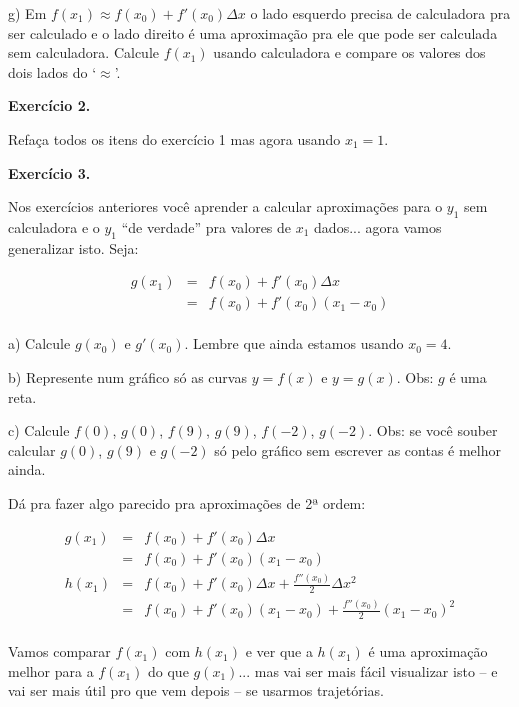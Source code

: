 \documentclass[oneside,12pt]{article}
\begin{document}
g) Em $f(x_1) ≈ f(x_0) + f'(x_0)Δx$ o lado esquerdo precisa de
calculadora pra ser calculado e o lado direito é uma aproximação pra
ele que pode ser calculada sem calculadora. Calcule $f(x_1)$ usando
calculadora e compare os valores dos dois lados do `$≈$'.

\bsk

{\bf Exercício 2.}

Refaça todos os itens do exercício 1 mas agora usando $x_1=1$.



\newpage


{\bf Exercício 3.}

Nos exercícios anteriores você aprender a calcular aproximações para o
$y_1$ sem calculadora e o $y_1$ ``de verdade'' pra valores de $x_1$
dados... agora vamos generalizar isto. Seja:

$$\begin{array}{rcl}
  g(x_1) &=& f(x_0) + f'(x_0)Δx \\
         &=& f(x_0) + f'(x_0)(x_1-x_0) \\
  \end{array}
$$

a) Calcule $g(x_0)$ e $g'(x_0)$. Lembre que ainda estamos usando
$x_0=4$.

b) Represente num gráfico só as curvas $y=f(x)$ e $y=g(x)$. Obs: $g$ é
uma reta.

c) Calcule $f(0)$, $g(0)$, $f(9)$, $g(9)$, $f(-2)$, $g(-2)$. Obs: se
você souber calcular $g(0)$, $g(9)$ e $g(-2)$ só pelo gráfico sem
escrever as contas é melhor ainda.

\newpage

Dá pra fazer algo parecido pra aproximações de 2ª ordem:

$$\begin{array}{rcl}
  g(x_1) &=& f(x_0) + f'(x_0)Δx \\
         &=& f(x_0) + f'(x_0)(x_1-x_0) \\
  h(x_1) &=& f(x_0) + f'(x_0)Δx        + \frac{f''(x_0)}{2}Δx^2 \\
         &=& f(x_0) + f'(x_0)(x_1-x_0) + \frac{f''(x_0)}{2}(x_1-x_0)^2 \\
  \end{array}
$$

Vamos comparar $f(x_1)$ com $h(x_1)$ e ver que a $h(x_1)$ é uma
aproximação melhor para a $f(x_1)$ do que $g(x_1)$... mas vai ser mais
fácil visualizar isto -- e vai ser mais útil pro que vem depois -- se
usarmos trajetórias.
\end{document}
